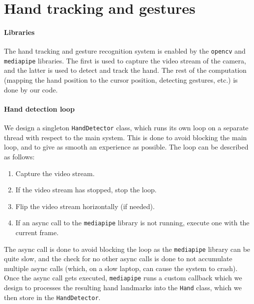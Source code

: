 \documentclass[a4paper, 11pt, twocolumn]{IEEEtran}
\begin{document}
    \section{Hand tracking and gestures}
    \paragraph*{Libraries} The hand tracking and gesture recognition system is enabled by the \texttt{opencv} and \texttt{mediapipe} libraries. The first is used to capture the video stream of the camera, and the latter is used to detect and track the hand. The rest of the computation (mapping the hand position to the cursor position, detecting gestures, etc.) is done by our code.
    \paragraph*{Hand detection loop} We design a singleton \texttt{HandDetector} class, which runs its own loop on a separate thread with respect to the main system. This is done to avoid blocking the main loop, and to give as smooth an experience as possible. The loop can be described as follows:
    \begin{enumerate}
        \item Capture the video stream.
        \item If the video stream has stopped, stop the loop.
        \item Flip the video stream horizontally (if needed).
        \item If an async call to the \texttt{mediapipe} library is not running, execute one with the current frame.
    \end{enumerate}
    The async call is done to avoid blocking the loop as the \texttt{mediapipe} library can be quite slow, and the check for no other async calls is done to not accumulate multiple async calls (which, on a slow laptop, can cause the system to crash). Once the async call gets executed, \texttt{mediapipe} runs a custom callback which we design to processes the resulting hand landmarks into the \texttt{Hand} class, which we then store in the \texttt{HandDetector}.
\end{document}
